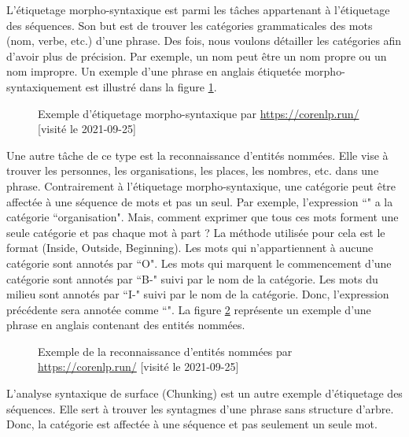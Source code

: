 \documentclass{KodeBook}
\begin{document}
L'étiquetage morpho-syntaxique est parmi les tâches appartenant à l'étiquetage des séquences. 
Son but est de trouver les catégories grammaticales des mots (nom, verbe, etc.) d'une phrase. 
Des fois, nous voulons détailler les catégories afin d'avoir plus de précision. 
Par exemple, un nom peut être un nom propre ou un nom impropre.
Un exemple d'une phrase en anglais étiquetée morpho-syntaxiquement est illustré dans la figure \ref{fig:ems-exp}.
\begin{figure}[ht]
	\centering
	\caption[Exemple d'étiquetage morpho-syntaxique]{Exemple d'étiquetage morpho-syntaxique par \url{https://corenlp.run/} [visité le 2021-09-25]\label{fig:ems-exp}}
\end{figure}

Une autre tâche de ce type est la reconnaissance d'entités nommées.
Elle vise à trouver les personnes, les organisations, les places, les nombres, etc. dans une phrase. 
Contrairement à l'étiquetage morpho-syntaxique, une catégorie peut être affectée à une séquence de mots et pas un seul. 
Par exemple, l'expression ``" a la catégorie ``organisation".
Mais, comment exprimer que tous ces mots forment une seule catégorie et pas chaque mot à part ?
La méthode utilisée pour cela est le format  (Inside, Outside, Beginning). 
Les mots qui n'appartiennent à aucune catégorie sont annotés par ``O". 
Les mots qui marquent le commencement d'une catégorie sont annotés par ``B-" suivi par le nom de la catégorie. 
Les mots du milieu sont annotés par ``I-" suivi par le nom de la catégorie. 
Donc, l'expression précédente sera annotée comme ``".
La figure \ref{fig:ner-exp} représente un exemple d'une phrase en anglais contenant des entités nommées.
\begin{figure}[ht]
	\centering
	\caption[Exemple de la reconnaissance d'entités nommées]{Exemple de la reconnaissance d'entités nommées par \url{https://corenlp.run/} [visité le 2021-09-25]\label{fig:ner-exp}}
\end{figure}

L'analyse syntaxique de surface (Chunking) est un autre exemple d'étiquetage des séquences.
Elle sert à trouver les syntagmes d'une phrase sans structure d'arbre. 
Donc, la catégorie est affectée à une séquence et pas seulement un seule mot.


\end{document}
